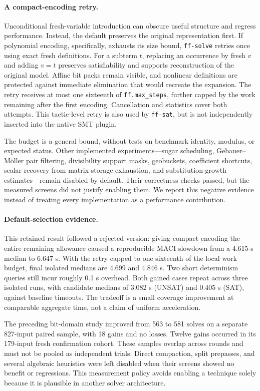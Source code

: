\documentclass[runningheads]{llncs}
\newcommand{\flag}[1]{\texttt{#1}}
\begin{document}
\paragraph{A compact-encoding retry.}
Unconditional fresh-variable introduction can obscure useful structure and
regress performance. Instead, the default preserves the original representation
first. If polynomial encoding, specifically, exhausts its size bound,
\flag{ff-solve} retries once using exact fresh definitions. For a subterm $t$,
replacing an occurrence by fresh $v$ and adding $v=t$ preserves satisfiability
and supports reconstruction of the original model. Affine bit packs remain
visible, and nonlinear definitions are protected against immediate elimination
that would recreate the expansion. The retry receives at most one sixteenth of
\flag{ff.max\_steps}, further capped by the work remaining after the first
encoding. Cancellation and statistics cover both attempts. This tactic-level
retry is also used by \flag{ff-sat}, but is not independently inserted into the
native SMT plugin.

The budget is a general bound, without tests on benchmark identity, modulus, or
expected status. Other implemented experiments---sugar scheduling,
Gebauer--M\"oller pair filtering, divisibility support masks, geobuckets,
coefficient shortcuts, scalar recovery from matrix storage exhaustion, and
substitution-growth estimates---remain disabled by default. Their correctness
checks passed, but the measured screens did not justify enabling them. We
report this negative evidence instead of treating every implementation as a
performance contribution.

\paragraph{Default-selection evidence.}
This retained result followed a rejected version: giving compact encoding the
entire remaining allowance caused a reproducible MACI slowdown from a 4.615-s
median to 6.647 s. With the retry capped to one sixteenth of the local work
budget, final isolated medians are 4.699 and 4.846 s. Two short determinism
queries still incur roughly 0.1 s overhead. Both gained cases repeat across
three isolated runs, with candidate medians of 3.082 s (UNSAT) and 0.405 s (SAT),
against baseline timeouts. The tradeoff is a small coverage improvement at
comparable aggregate time, not a claim of uniform acceleration.

The preceding bit-domain study improved from 563 to 581 solves on a separate
827-input paired sample, with 18 gains and no losses. Twelve gains occurred in
its 179-input fresh confirmation cohort. These samples overlap across rounds
and must not be pooled as independent trials. Direct compaction, split prepasses,
and several algebraic heuristics were left disabled when their screens showed
no benefit or regressions. This measurement policy avoids enabling a technique
solely because it is plausible in another solver architecture.
\end{document}
